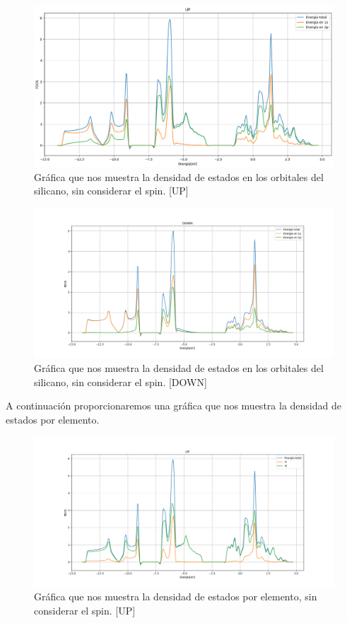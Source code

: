 \begin{figure}[H]
    \centering
    \includegraphics[scale=0.28]{images_silicano/Densidad_estados_sin_spin_up.png}
    \caption{Gráfica que nos muestra la densidad de estados en los orbitales del silicano, sin considerar el spin. [UP]}
\end{figure}

\begin{figure}[H]
    \centering
    \includegraphics[scale=0.38]{images_silicano/Densidad_estados_sin_spin_down.png}
    \caption{Gráfica que nos muestra la densidad de estados en los orbitales del silicano, sin considerar el spin. [DOWN]}
\end{figure}

\vspace{0.5cm}

A continuación proporcionaremos una gráfica que nos muestra la densidad de 
estados por elemento.

\begin{figure}[H]
    \centering
    \includegraphics[scale=0.38]{images_silicano/Densidad_estados_sin_spin_up_elementos.png}
    \caption{Gráfica que nos muestra la densidad de estados por elemento, sin considerar el spin. [UP]}
\end{figure}

